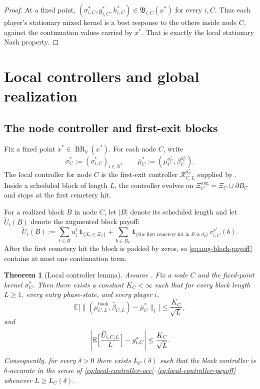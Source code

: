 \documentclass[12pt]{article}
\newtheorem{theorem}{Theorem}[section]
\theoremstyle{definition}
\newcommand{\E}{\mathbb{E}}
\newcommand{\1}{\mathbf{1}}
\DeclareMathOperator{\BR}{BR}
\begin{document}
\begin{proof}
At a fixed point,
$(\sigma_{i,C}^*,g_{i,C}^*,h_{i,C}^*)\in\mathfrak B_{i,C}(x^*)$ for every $i,C$.
Thus each player's stationary mixed kernel is a best response to the others inside
node $C$, against the continuation values carried by $x^*$. That is exactly the
local stationary Nash property.
\end{proof}

\section{Local controllers and global realization}
\label{sec:realization}

\subsection{The node controller and first-exit blocks}

Fix a fixed point $x^*\in\BR_\eta(x^*)$. For each node $C$, write
\[
\sigma_C^*:=(\sigma_{i,C}^*)_{i\in N},
\qquad
\bar\mu_C^*:=(\mu_C^{\sigma_C^*},\beta_C^{\sigma_C^*}).
\]
The local controller for node $C$ is the first-exit controller
$\mathcal R_{C,L}^{\sigma_C^*}$ supplied by . Inside a
scheduled block of length $L$, the controller evolves on
$\Xi_C^{\mathrm{aug}}=\Xi_C\sqcup\partial B_C$ and stops at the first cemetery hit.

For a realized block $B$ in node $C$, let $|B|$ denote its scheduled length and
let $\widetilde U_i(B)$ denote the augmented block payoff:
\begin{equation}
\label{eq:aug-block-payoff}
\widetilde U_i(B)
:=
\sum_{t\in B} u_i^t\,\1_{\{X_t\in \Xi_C\}}
+
\sum_{b\in B_C}\1_{\{\text{the first cemetery hit in }B\text{ is }\partial_b\}}
\,v_{i,C}^{x^*}(b).
\end{equation}
After the first cemetery hit the block is padded by zeros, so \eqref{eq:aug-block-payoff}
contains at most one continuation term.

\begin{theorem}[Local controller lemma]
\label{thm:local-controller}
Assume . Fix a node $C$ and the fixed-point kernel
$\sigma_C^*$. Then there exists a constant $K_C<\infty$ such that for every block
length $L\ge 1$, every entry phase-state, and every player $i$,
\begin{equation}
\label{eq:local-controller-occ}
\E\bigl[\|(\widehat\mu_{C,L}^{\mathrm{book}},\widehat\beta_{C,L})-\bar\mu_C^*\|_1\bigr]
\le \frac{K_C}{\sqrt L},
\end{equation}
and
\begin{equation}
\label{eq:local-controller-payoff}
\left|
\E\Bigl[\frac{\widetilde U_{i,C,L}}{L}\Bigr]-g_{i,C}^*
\right|
\le \frac{K_C}{\sqrt L}.
\end{equation}
Consequently, for every $\delta>0$ there exists $L_C(\delta)$ such that the block
controller is $\delta$-accurate in the sense of
\eqref{eq:local-controller-occ}--\eqref{eq:local-controller-payoff} whenever
$L\ge L_C(\delta)$.
\end{theorem}
\end{document}
